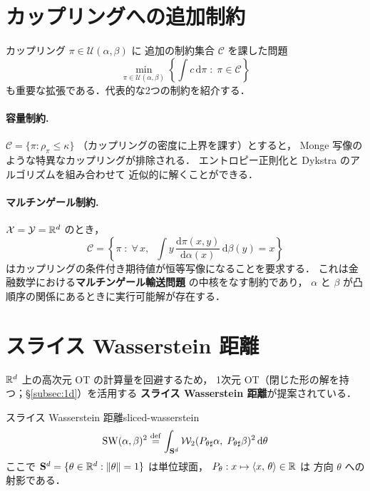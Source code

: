 \section{カップリングへの追加制約}\label{sec:extra-constraints}

カップリング $\pi \in \mathcal{U}(\alpha, \beta)$ に
追加の制約集合 $\mathcal{C}$ を課した問題
\[
  \min_{\pi \in \mathcal{U}(\alpha, \beta)}
  \left\{\int c\, \mathrm{d}\pi \;:\; \pi \in \mathcal{C}\right\}
\]
も重要な拡張である．代表的な2つの制約を紹介する．

\paragraph{容量制約.}
$\mathcal{C} = \{\pi : \rho_\pi \leq \kappa\}$
（カップリングの密度に上界を課す）とすると，
Monge 写像のような特異なカップリングが排除される．
エントロピー正則化と Dykstra のアルゴリズムを組み合わせて
近似的に解くことができる．

\paragraph{マルチンゲール制約.}
$\mathcal{X} = \mathcal{Y} = \mathbb{R}^d$ のとき，
\[
  \mathcal{C} = \left\{\pi \;:\;
  \forall\, x,\;\;
  \int y\, \frac{\mathrm{d}\pi(x,y)}{\mathrm{d}\alpha(x)}\, \mathrm{d}\beta(y) = x
  \right\}
\]
はカップリングの条件付き期待値が恒等写像になることを要求する．
これは金融数学における\textbf{マルチンゲール輸送問題}
の中核をなす制約であり，
$\alpha$ と $\beta$ が凸順序の関係にあるときに実行可能解が存在する．


\section{スライス Wasserstein 距離}\label{sec:sliced}

$\mathbb{R}^d$ 上の高次元 OT の計算量を回避するため，
1次元 OT（閉じた形の解を持つ；§\ref{subsec:1d}）を活用する
\textbf{スライス Wasserstein 距離}が提案されている．

\begin{definition}{スライス Wasserstein 距離}{sliced-wasserstein}
\begin{equation}\label{eq:sliced}
  \mathrm{SW}(\alpha, \beta)^2
  \overset{\mathrm{def}}{=} \int_{\mathbf{S}^d}
  \mathcal{W}_2(P_{\theta\sharp}\alpha,\; P_{\theta\sharp}\beta)^2\,
  \mathrm{d}\theta
\end{equation}
ここで $\mathbf{S}^d = \{\theta \in \mathbb{R}^d : \|\theta\| = 1\}$ は単位球面，
$P_\theta : x \mapsto \langle x,\, \theta \rangle \in \mathbb{R}$ は
方向 $\theta$ への射影である．
\end{definition}

